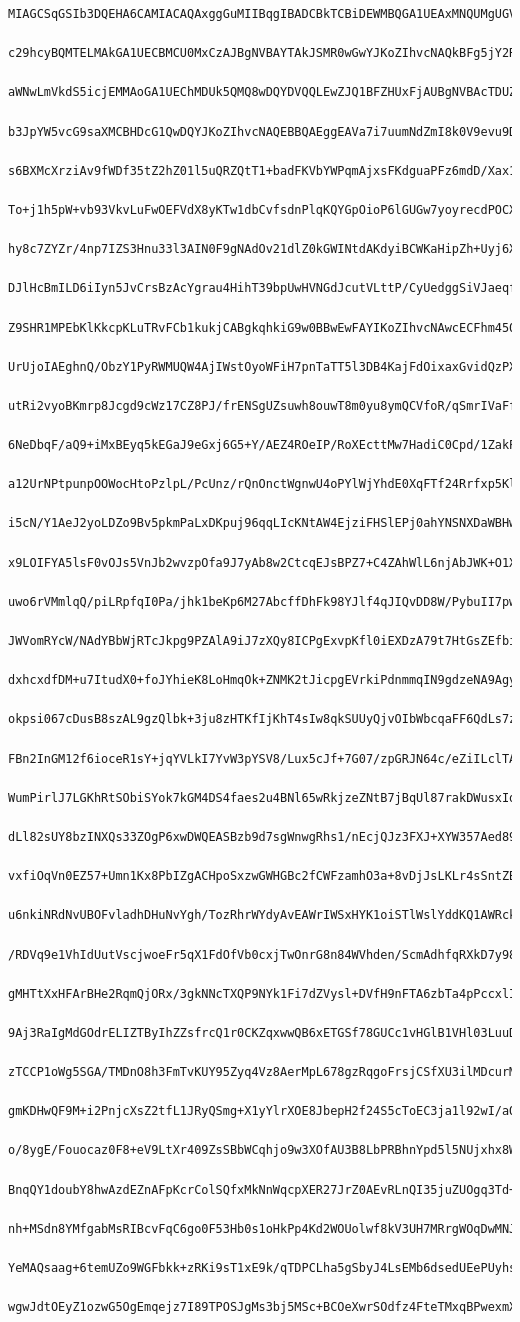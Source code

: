 \documentclass[
    article,            %
    11pt,               %
    oneside,            %
    a4paper,            %
    english,            %
    brazil,             %
    sumario=tradicional,
    ]{abntex2}
\begin{document}
\begin{Verbatim}[frame=single, commandchars=\\\{\}, fontsize=\footnotesize]
    MIAGCSqGSIb3DQEHA6CAMIACAQAxggGuMIIBqgIBADCBkTCBiDEWMBQGA1UEAxMNQUMgUGVz
    c29hcyBQMTELMAkGA1UECBMCU0MxCzAJBgNVBAYTAkJSMR0wGwYJKoZIhvcNAQkBFg5jY2RA
    aWNwLmVkdS5icjEMMAoGA1UEChMDUk5QMQ8wDQYDVQQLEwZJQ1BFZHUxFjAUBgNVBAcTDUZs
    b3JpYW5vcG9saXMCBHDcG1QwDQYJKoZIhvcNAQEBBQAEggEAVa7i7uumNdZmI8k0V9evu9Dq
    s6BXMcXrziAv9fWDf35tZ2hZ01l5uQRZQtT1+badFKVbYWPqmAjxsFKdguaPFz6mdD/Xax1W
    To+j1h5pW+vb93VkvLuFwOEFVdX8yKTw1dbCvfsdnPlqKQYGpOioP6lGUGw7yoyrecdPOCX7
    hy8c7ZYZr/4np7IZS3Hnu33l3AIN0F9gNAdOv21dlZ0kGWINtdAKdyiBCWKaHipZh+Uyj6Xu
    DJlHcBmILD6iIyn5JvCrsBzAcYgrau4HihT39bpUwHVNGdJcutVLttP/CyUedggSiVJaeqfT
    Z9SHR1MPEbKlKkcpKLuTRvFCb1kukjCABgkqhkiG9w0BBwEwFAYIKoZIhvcNAwcECFhm450D
    UrUjoIAEghnQ/ObzY1PyRWMUQW4AjIWstOyoWFiH7pnTaTT5l3DB4KajFdOixaxGvidQzPX2
    utRi2vyoBKmrp8Jcgd9cWz17CZ8PJ/frENSgUZsuwh8ouwT8m0yu8ymQCVfoR/qSmrIVaFf9
    6NeDbqF/aQ9+iMxBEyq5kEGaJ9eGxj6G5+Y/AEZ4ROeIP/RoXEcttMw7HadiC0Cpd/1ZakPS
    a12UrNPtpunpOOWocHtoPzlpL/PcUnz/rQnOnctWgnwU4oPYlWjYhdE0XqFTf24Rrfxp5Kl6
    i5cN/Y1AeJ2yoLDZo9Bv5pkmPaLxDKpuj96qqLIcKNtAW4EjziFHSlEPj0ahYNSNXDaWBHwS
    x9LOIFYA5lsF0vOJs5VnJb2wvzpOfa9J7yAb8w2CtcqEJsBPZ7+C4ZAhWlL6njAbJWK+O1Xu
    uwo6rVMmlqQ/piLRpfqI0Pa/jhk1beKp6M27AbcffDhFk98YJlf4qJIQvDD8W/PybuII7pwb
    JWVomRYcW/NAdYBbWjRTcJkpg9PZAlA9iJ7zXQy8ICPgExvpKfl0iEXDzA79t7HtGsZEfbiM
    dxhcxdfDM+u7ItudX0+foJYhieK8LoHmqOk+ZNMK2tJicpgEVrkiPdnmmqIN9gdzeNA9AgyQ
    okpsi067cDusB8szAL9gzQlbk+3ju8zHTKfIjKhT4sIw8qkSUUyQjvOIbWbcqaFF6QdLs7zk
    FBn2InGM12f6ioceR1sY+jqYVLkI7YvW3pYSV8/Lux5cJf+7G07/zpGRJN64c/eZiILclTAS
    WumPirlJ7LGKhRtSObiSYok7kGM4DS4faes2u4BNl65wRkjzeZNtB7jBqUl87rakDWusxIo8
    dLl82sUY8bzINXQs33ZOgP6xwDWQEASBzb9d7sgWnwgRhs1/nEcjQJz3FXJ+XYW357Aed89G
    vxfiOqVn0EZ57+Umn1Kx8PbIZgACHpoSxzwGWHGBc2fCWFzamhO3a+8vDjJsLKLr4sSntZB6
    u6nkiNRdNvUBOFvladhDHuNvYgh/TozRhrWYdyAvEAWrIWSxHYK1oiSTlWslYddKQ1AWRck3
    /RDVq9e1VhIdUutVscjwoeFr5qX1FdOfVb0cxjTwOnrG8n84WVhden/ScmAdhfqRXkD7y987
    gMHTtXxHFArBHe2RqmQjORx/3gkNNcTXQP9NYk1Fi7dZVysl+DVfH9nFTA6zbTa4pPccxlI/
    9Aj3RaIgMdGOdrELIZTByIhZZsfrcQ1r0CKZqxwwQB6xETGSf78GUCc1vHGlB1VHl03LuuDn
    zTCCP1oWg5SGA/TMDnO8h3FmTvKUY95Zyq4Vz8AerMpL678gzRqgoFrsjCSfXU3ilMDcurMy
    gmKDHwQF9M+i2PnjcXsZ2tfL1JRyQSmg+X1yYlrXOE8JbepH2f24S5cToEC3ja1l92wI/aQB
    o/8ygE/Fouocaz0F8+eV9LtXr409ZsSBbWCqhjo9w3XOfAU3B8LbPRBhnYpd5l5NUjxhx8Wa
    BnqQY1doubY8hwAzdEZnAFpKcrColSQfxMkNnWqcpXER27JrZ0AEvRLnQI35juZUOgq3Td+2
    nh+MSdn8YMfgabMsRIBcvFqC6go0F53Hb0s1oHkPp4Kd2WOUolwf8kV3UH7MRrgWOqDwMNJe
    YeMAQsaag+6temUZo9WGFbkk+zRKi9sT1xE9k/qTDPCLha5gSbyJ4LsEMb6dsedUEePUyhs1
    wgwJdtOEyZ1ozwG5OgEmqejz7I89TPOSJgMs3bj5MSc+BCOeXwrSOdfz4FteTMxqBPwexmXX

\end{Verbatim}
\end{document}
